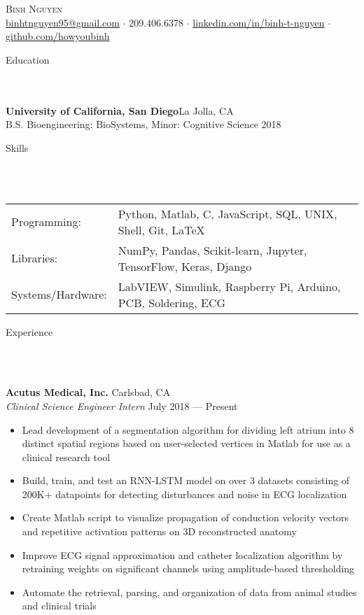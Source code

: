 \documentclass[a4paper]{article}
\newcommand{\lineunder} {
    \vspace*{-8pt} \\
    \hspace*{-18pt} \hrulefill \\
}
\newcommand{\header} [1] {
    {\hspace*{-18pt}\vspace*{6pt} \Large{#1} }
    \vspace*{-6pt} 
    \lineunder
}
\begin{document}
\vspace*{-40pt}

    

\vspace*{-10pt}
\begin{center}
	{\Huge \scshape {Binh Nguyen}}\\
	\href{mailto:binhtnguyen95@gmail.com}{binhtnguyen95@gmail.com} $\cdot$ 
	209.406.6378 $\cdot$ 
	\href{https://www.linkedin.com/in/binh-t-nguyen}{linkedin.com/in/binh-t-nguyen} $\cdot$ 
	\href{https://www.github.com/howyoubinh}{github.com/howyoubinh}\\
\end{center}

\header{Education}
\textbf{University of California, San Diego}\hfill La Jolla, CA\\
B.S. Bioengineering: BioSystems, Minor: Cognitive Science \hfill 2018\\
\vspace{2mm}

\header{Skills}
\begin{tabular}{ l l }
\hspace{-1mm}
	Programming: & Python, Matlab, C, JavaScript, SQL, UNIX, Shell, Git, \LaTeX \\
	Libraries:   & NumPy, Pandas, Scikit-learn, Jupyter, TensorFlow, Keras, Django \\
	Systems/Hardware:    & LabVIEW, Simulink, Raspberry Pi, Arduino, PCB, Soldering, ECG \\
\end{tabular}
\vspace{2mm}

\header{Experience}
\vspace{1mm}

\textbf{Acutus Medical, Inc.} \hfill Carlsbad, CA\\
\textit{Clinical Science Engineer Intern} \hfill July 2018 --- Present\\
\vspace{-2mm}
\begin{itemize} \itemsep 0.1pt
	\item Lead development of a segmentation algorithm for dividing left atrium into 8 distinct spatial regions based on user-selected vertices in Matlab for use as a clinical research tool
	\item Build, train, and test an RNN-LSTM model on over 3 datasets consisting of 200K+ datapoints for detecting disturbances and noise in ECG localization
	\item Create Matlab script to visualize propagation of conduction velocity vectors and repetitive activation patterns on 3D reconstructed anatomy
	\item Improve ECG signal approximation and catheter localization algorithm by retraining weights on significant channels using amplitude-based thresholding
	\item Automate the retrieval, parsing, and organization of data from animal studies and clinical trials
\end{itemize}
\end{document}
